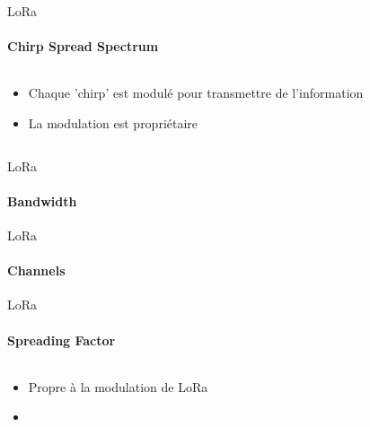 \begin{frame}{LoRa}
\framesubtitle{Chirp Spread Spectrum}
\begin{columns}
  \begin{column}{0.5\textwidth}
    \begin{itemize}
      \item Chaque 'chirp' est modulé pour transmettre de l'information
      \item La modulation est propriétaire
    \end{itemize}
  \end{column}
  \begin{column}{0.5\textwidth}
    \begin{center}
    \end{center}
  \end{column}
\end{columns}
\end{frame}

\begin{frame}{LoRa}
\framesubtitle{Bandwidth}
\end{frame}

\begin{frame}{LoRa}
\framesubtitle{Channels}
\end{frame}

\begin{frame}{LoRa}
\framesubtitle{Spreading Factor}
\begin{columns}
  \begin{column}{0.5\textwidth}
    \begin{itemize}
      \item Propre à la modulation de LoRa
      \item 
    \end{itemize}
  \end{column}
  \begin{column}{0.5\textwidth}
    
  \end{column}
\end{columns}
\end{frame}
